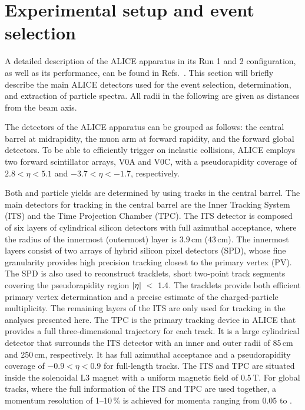 \section{Experimental setup and event selection}\label{Sec:ALICE}

A detailed description of the ALICE apparatus in its Run 1 and 2 configuration, as well as its performance, can be found in Refs.~\cite{ALICE1,ALICE2}. This section will briefly describe the main ALICE detectors used for the event selection, \SOPT determination, and extraction of particle spectra. All radii in the following are given as distances from the beam axis.

The detectors of the ALICE apparatus can be grouped as follows: the central barrel at midrapidity, the muon arm at forward rapidity, and the forward global detectors. To be able to efficiently trigger on inelastic \pp collisions, ALICE employs two forward scintillator arrays, V0A and V0C, with a pseudorapidity coverage of $2.8 < \eta < 5.1$ and $-3.7 < \eta < -1.7$,
respectively. 


Both \SOPT and particle yields are determined by using tracks in the central barrel. The main detectors for tracking in the central barrel are the Inner Tracking System (ITS) and the Time Projection Chamber (TPC). The ITS detector is composed of six layers of cylindrical silicon detectors with full azimuthal acceptance, where the radius of the innermost (outermost) layer is $3.9$\,cm ($43$\,cm). The innermost layers consist of two arrays of hybrid silicon pixel detectors (SPD), whose fine granularity provides high precision tracking closest to the primary vertex (PV). The SPD is also used to reconstruct tracklets, short two-point track segments covering the pseudorapidity region $\mbox{$\left | \eta \right |~<~1.4$}$. The tracklets provide both efficient primary vertex determination and a precise estimate of the charged-particle multiplicity. The remaining layers of the ITS are only used for tracking in the analyses presented here. The TPC is the primary tracking device in ALICE that provides a full three-dimensional trajectory for  each track. It is a large cylindrical detector that surrounds the ITS detector with an inner and outer radii of 85\,cm and 250\,cm, respectively.  It has full azimuthal acceptance and a pseudorapidity coverage of $-0.9< \eta <0.9$ for full-length tracks. The ITS and TPC are situated inside the solenoidal L3 magnet with a uniform magnetic field of 0.5\,T. For global tracks, where the full information of the ITS and TPC are used together, a momentum resolution of 1--10\,\% is achieved for momenta ranging from 0.05 to .

